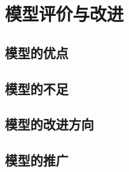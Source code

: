 \section{模型评价与改进}

\subsection{模型的优点}

\subsection{模型的不足}

\subsection{模型的改进方向}

\subsection{模型的推广}
